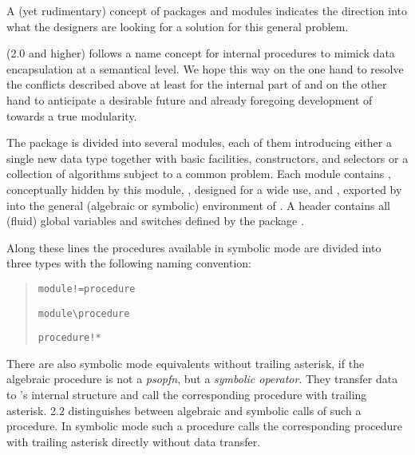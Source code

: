 A (yet rudimentary) concept of \REDUCE packages and modules indicates the
direction into what the \REDUCE designers are looking for a solution
for this general problem.
\medskip

 (2.0 and higher) follows a name concept for internal procedures
to mimick data encapsulation at a semantical level. We hope this way
on the one hand to resolve the conflicts described above at least for
the internal part of  and on the other hand to anticipate a
desirable future and already foregoing development of \REDUCE towards
a true modularity.

The package  is divided into several modules, each of them
introducing either a single new data type together with basic
facilities, constructors, and selectors or a collection of algorithms
subject to a common problem. Each module contains , conceptually hidden by this module, , designed for a  wide use, and , exported by  into the general (algebraic or
symbolic) environment of \REDUCE. A header  contains
all (fluid) global variables and switches defined by the package
.

Along these lines the  procedures available in symbolic mode are
divided into three types with the following naming convention:
\begin{quote}
\texttt{module!=procedure}


\texttt{module\textbackslash procedure}


\texttt{procedure!*}

\end{quote}
There are also symbolic mode equivalents without trailing asterisk, if
the algebraic procedure is not a \emph{psopfn}, but a \emph{symbolic
operator}. They transfer data to 's internal structure and call
the corresponding procedure with trailing asterisk.  2.2
distinguishes between algebraic and symbolic calls of such a
procedure. In symbolic mode such a procedure calls the corresponding
procedure with trailing asterisk directly without data transfer.
\medskip

